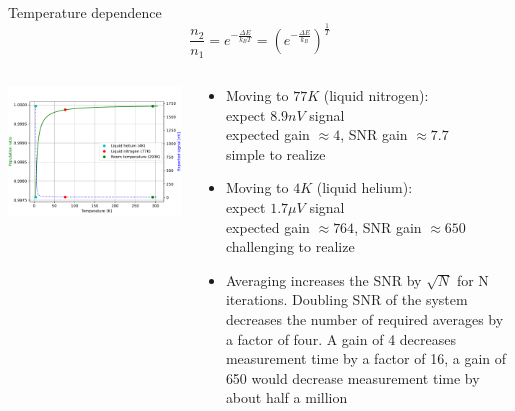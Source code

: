 \documentclass[final]{beamer}
\begin{document}
\begin{frame}[fragile]{}
\begin{columns}[T]
\begin{column}{.49\linewidth}
\begin{block}{\large Temperature dependence}
        $$\frac{n_2}{n_1} = e^{-\frac{\Delta E}{k_B T}} = \left(e^{- \frac{\Delta E}{k_B}}\right)^\frac{1}{T}$$

        \begin{columns}
          \begin{column}{0.4\columnwidth}
            \includegraphics[width=\columnwidth]{figures/tempn2n1.pdf}
          \end{column}
          \begin{column}{0.6\columnwidth}
            \begin{itemize}
              \item Moving to $77K$ (liquid nitrogen): \\ expect $8.9nV$ signal \\ expected gain $\approx 4$, SNR gain $\approx 7.7$ \\ simple to realize
              \item Moving to $4K$ (liquid helium): \\ expect $1.7\mu V$ signal \\ expected gain $\approx 764$, SNR gain $\approx 650$ \\ challenging to realize
              \item Averaging increases the SNR by $\sqrt{N}$ for N iterations. Doubling SNR of the system decreases the number of required averages by a factor of four. A gain of 4 decreases measurement time by a factor of 16,
              a gain of 650 would decrease measurement time by about half a million
            \end{itemize}
          \end{column}
        \end{columns}
      \end{block}


\end{column}
\end{columns}
\end{frame}
\end{document}
